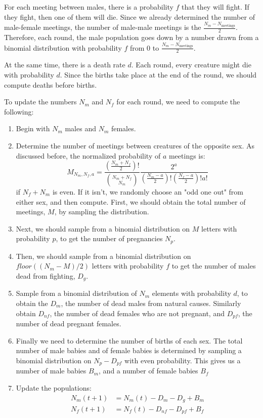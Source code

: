 \documentclass{article}
\begin{document}
For each meeting between males, there is a probability $f$ that they will fight.
If they fight, then one of them will die.
Since we already determined the number of male-female meetings, the number of male-male
	meetings is the $\frac{N_m - N_{\text{meetings}}}{2}$.
Therefore, each round, the male population goes down by a number drawn from a binomial 
	distribution with probability $f$ from $0$ to $\frac{N_m - N_{\text{meetings}}}{2}$.

At the same time, there is a death rate $d$.
Each round, every creature might die with probability $d$.
Since the births take place at the end of the round, we should compute deaths
	before births.

To update the numbers $N_m$ and $N_f$ for each round, we need to compute the following:

\begin{enumerate}
\item Begin with $N_m$ males and $N_m$ females.
\item Determine the number of meetings between creatures of the opposite sex.
	As discussed before, the normalized probability of $a$ meetings is:
	\[ M_{N_m, N_f, a} = \frac{ \left( \frac{N_m + N_f}{2} \right)!}{ { N_m + N_f \choose N_m}}
					\frac{ 2^a } { \left( \frac{N_m - a }{2} \right)!
									\left( \frac{N_f - a}{2} \right)!
					a! } \]
		if $N_f + N_m$ is even.
	If it isn't, we randomly choose an "odd one out" from either sex,
		and then compute.
	First, we should obtain the total number of meetings, $M$, by sampling the distribution.
	
\item Next, we should sample from a binomial distribution on $M$ letters with probability $p$,
		to get the number of pregnancies $N_p$.
\item Then, we should sample from a binomial distribution on $floor((N_m - M)/2)$ letters
		with probability $f$ to get the number of males dead from fighting, $D_g$.
\item Sample from a binomial distribution of $N_m$ elements with probability $d$,
		to obtain the $D_m$, the number of dead males from natural causes.
	Similarly obtain $D_{nf}$, the number of dead females who are not pregnant,
		and $D_{pf}$, the number of dead pregnant females.
\item Finally we need to determine the number of births of each sex.
		The total number of male babies and of female babies is determined by sampling
			a binomial distribution on $N_p - D_{pf}$ with even probability.
		This gives us a number of male babies $B_m$, and a number of female babies $B_f$
\item Update the populations:
		\begin{align*}
				N_m(t+1) & = N_m(t) - D_m - D_g + B_m \\
				N_f(t+1) & = N_f(t) - D_{nf} - D_{pf} + B_f \\
		\end{align*}
\end{enumerate}
\end{document}
